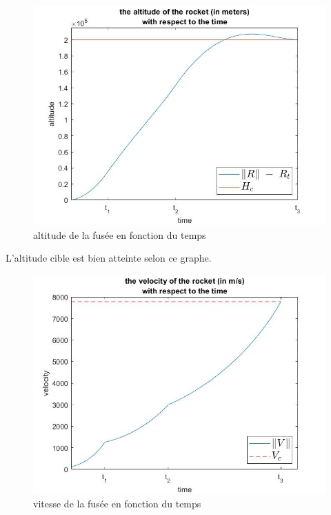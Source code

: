 \clearpage
\begin{center}
\begin{figure}[t]
\includegraphics[scale=0.65]{./graphs/altitude.jpg}
\caption{altitude de la fusée en fonction du temps}
\end{figure}
\end{center}

L'altitude cible est bien atteinte selon ce graphe.

\clearpage
\begin{center}
\begin{figure}[t]
\includegraphics[scale=0.65]{./graphs/velocity.jpg}
\caption{vitesse de la fusée en fonction du temps}
\end{figure}
\end{center}

